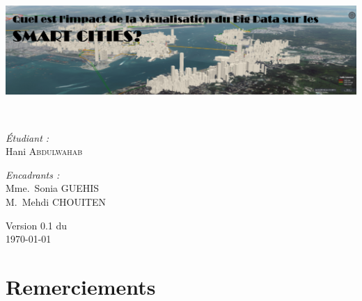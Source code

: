 \documentclass[french, a4paper, 12pt]{report}
\begin{document}
\begin{titlepage}
\begin{center}
\centerline{\includegraphics[width=20.5cm]{images/cover.png}}
\\[1.5cm]

\noindent
\begin{minipage}{0.4\textwidth}
  \begin{flushleft} \large
    \emph{Étudiant :}\\
    Hani \textsc{Abdulwahab}
  \end{flushleft}
\end{minipage}%
\begin{minipage}{0.4\textwidth}
  \begin{flushright} \large
    \emph{Encadrants :} \\
    Mme.~Sonia \textsc{GUEHIS}\\
    M.~Mehdi \textsc{CHOUITEN }
    
  \end{flushright}
\end{minipage}

\vfill

{\large Version 0.1 du\\ \today}

\end{center}
\end{titlepage}

\tableofcontents
\listoffigures
\chapter*{Remerciements}
\end{document}
